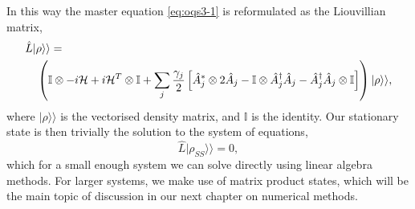  In this way the master equation \cref{eq:oqs3-1} is reformulated as the Liouvillian matrix,
 \begin{align}
 	&\hat{L}|\rho \rangle \rangle = \notag \\
 	&\quad \left( \mathbb{I} \otimes -i\mathcal{H} + i\mathcal{H}^{T} \otimes \mathbb{I} + \sum_{j} \frac{\gamma_{j}}{2} \left[ \hat{A}_{j}^{*} \otimes 2\hat{A}_{j} - \mathbb{I} \otimes \hat{A}_{j}^{\dagger}\hat{A}_{j} - \hat{A}_{j}^{\dagger}\hat{A}_{j} \otimes \mathbb{I} \right]\right)|\rho\rangle\rangle,
 	\label{eq:oqs4-3}
 \end{align}
 where \(|\rho \rangle\rangle\) is the vectorised density matrix, and \(\mathbb{I}\) is the identity. Our stationary state is then trivially the solution to the system of equations,
 \begin{equation}
 	\hat{L} |\rho_{SS} \rangle\rangle = 0,
 	\label{eq:oqs4-4}
 \end{equation}
 which for a small enough system we can solve directly using linear algebra methods. For larger systems, we make use of matrix product states, which will be the main topic of discussion in our next chapter on numerical methods.
